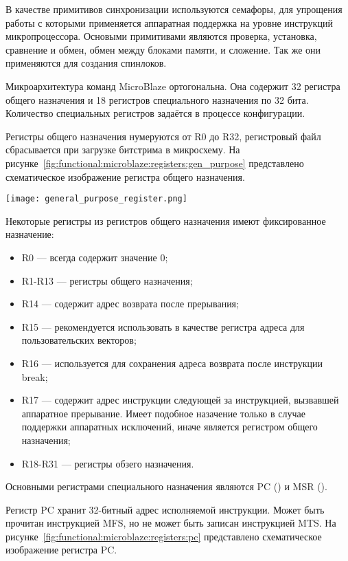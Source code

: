 В качестве примитивов синхронизации используются семафоры, для упрощения работы с которыми
применяется аппаратная поддержка на уровне инструкций микропроцессора. Основыми примитивами
являются проверка, установка, сравнение и обмен, обмен между блоками памяти, и сложение.
Так же они применяются для создания спинлоков.

Микроархитектура команд MicroBlaze ортогональна. Она содержит 32 регистра общего назначения
и 18 регистров специального назначения по 32 бита. Количество специальных регистров задаётся
в процессе конфигурации.

Регистры общего назначения нумеруются от R0 до R32, регистровый файл сбрасывается при загрузке
битстрима в микросхему. На рисунке~\ref{fig:functional:microblaze:registers:gen_purpose} представлено
схематическое изображение регистра общего назначения.

\begin{center}
  \centering
  \texttt{[image: general\_purpose\_register.png]}
  \label{fig:functional:microblaze:registers:gen_purpose}
\end{center}

Некоторые регистры из регистров общего назначения имеют фиксированное назначение:
\begin{itemize}
  \item R0 --- всегда содержит значение 0;
  \item R1-R13 --- регистры общего назначения;
  \item R14 --- содержит адрес возврата после прерывания;
  \item R15 --- рекомендуется использовать в качестве регистра
    адреса для пользовательских векторов;
  \item R16 --- используется для сохранения адреса возврата после инструкции break;
  \item R17 --- содержит адрес инструкции следующей за инструкцией, вызвавшей аппаратное
    прерывание. Имеет подобное назачение только в случае поддержки аппаратных исключений,
    иначе является регистром общего назначения;
  \item R18-R31 --- регистры обзего назначения.
\end{itemize}

Основными регистрами специального назначения являются PC () и MSR ().

Регистр PC хранит 32-битный адрес исполняемой инструкции. Может быть прочитан инструкцией MFS,
но не может быть записан инструкцией MTS. На рисунке~\ref{fig:functional:microblaze:registers:pc} представлено
схематическое изображение регистра PC.

